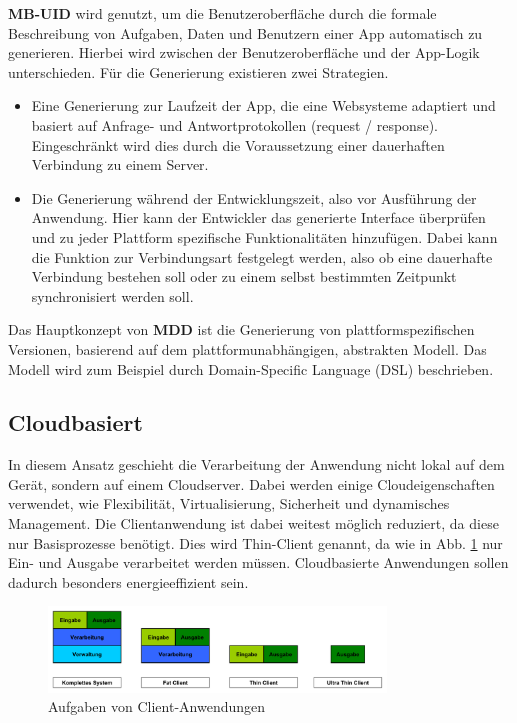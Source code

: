 \medskip
\textbf{MB-UID} wird genutzt, um die Benutzeroberfläche durch die formale Beschreibung von Aufgaben, Daten und Benutzern einer App automatisch zu generieren. Hierbei wird zwischen der Benutzeroberfläche und der App-Logik unterschieden.
Für die Generierung existieren zwei Strategien.

\begin{itemize}
	\item Eine Generierung zur Laufzeit der App, die eine Websysteme adaptiert und basiert auf Anfrage- und Antwortprotokollen (request / response). Eingeschränkt wird dies durch die Voraussetzung einer dauerhaften Verbindung zu einem Server.
	
	\item Die Generierung während der Entwicklungszeit, also vor Ausführung der Anwendung. Hier kann der Entwickler das generierte Interface überprüfen und zu jeder Plattform spezifische Funktionalitäten hinzufügen. Dabei kann die Funktion zur Verbindungsart festgelegt werden, also ob eine dauerhafte Verbindung bestehen soll oder zu einem selbst bestimmten Zeitpunkt synchronisiert werden soll.
\end{itemize}

\medskip
Das Hauptkonzept von \textbf{MDD} ist die Generierung von plattformspezifischen Versionen, basierend auf dem plattformunabhängigen, abstrakten Modell. Das Modell wird zum Beispiel durch Domain-Specific Language (DSL) beschrieben.

\subsection{Cloudbasiert}
In diesem Ansatz geschieht die Verarbeitung der Anwendung nicht lokal auf dem Gerät, sondern auf einem Cloudserver. Dabei werden einige Cloudeigenschaften verwendet, wie Flexibilität, Virtualisierung, Sicherheit und dynamisches Management. Die Clientanwendung ist dabei weitest möglich reduziert, da diese nur Basisprozesse benötigt. Dies wird Thin-Client genannt, da wie in Abb. \ref{client_aufgaben} nur Ein- und Ausgabe verarbeitet werden müssen. Cloudbasierte Anwendungen sollen dadurch besonders energieeffizient sein.

\begin{figure}[htbp]
	\centering
	\includegraphics[width=0.8\textwidth]{Bilder/Aufgaben_Endgeraet}
	\caption{Aufgaben von Client-Anwendungen}\label{client_aufgaben}
\end{figure}

